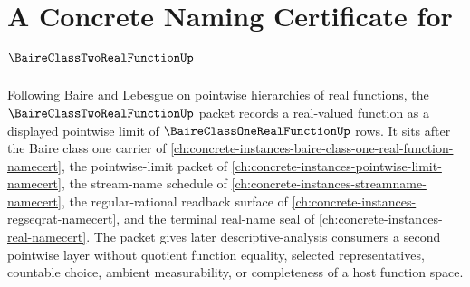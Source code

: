 \chapter{A Concrete Naming Certificate for $\BaireClassTwoRealFunctionUp$}
\label{ch:concrete-instances-baire-class-two-real-function-namecert}

Following Baire and Lebesgue on pointwise hierarchies of real functions, the $\BaireClassTwoRealFunctionUp$ packet records a real-valued function as a displayed pointwise limit of $\BaireClassOneRealFunctionUp$ rows. It sits after the Baire class one carrier of \autoref{ch:concrete-instances-baire-class-one-real-function-namecert}, the pointwise-limit packet of \autoref{ch:concrete-instances-pointwise-limit-namecert}, the stream-name schedule of \autoref{ch:concrete-instances-streamname-namecert}, the regular-rational readback surface of \autoref{ch:concrete-instances-regseqrat-namecert}, and the terminal real-name seal of \autoref{ch:concrete-instances-real-namecert}. The packet gives later descriptive-analysis consumers a second pointwise layer without quotient function equality, selected representatives, countable choice, ambient measurability, or completeness of a host function space.

